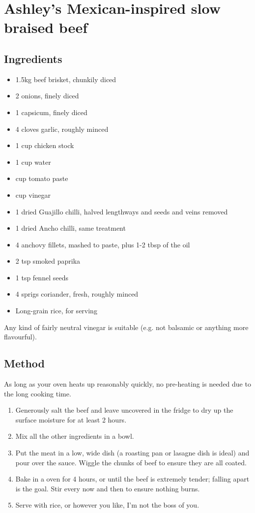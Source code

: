 \section{Ashley's Mexican-inspired slow braised beef}


\subsection{Ingredients}

\begin{itemize}
	\item 1.5kg beef brisket, chunkily diced
	\item 2 onions, finely diced
	\item 1 capsicum, finely diced
	\item 4 cloves garlic, roughly minced
	\item 1 cup chicken stock
	\item 1 cup water
	\item {} cup tomato paste
	\item {} cup vinegar
	\item 1 dried Guajillo chilli, halved lengthways and seeds and veins removed
	\item 1 dried Ancho chilli, same treatment
	\item 4 anchovy fillets, mashed to paste, plus 1-2 tbsp of the oil
	\item 2 tsp smoked paprika
	\item 1 tsp fennel seeds
	\item 4 sprigs coriander, fresh, roughly minced
	\item Long-grain rice, for serving
\end{itemize}

Any kind of fairly neutral vinegar is suitable (e.g. not balsamic or anything more flavourful).

\subsection{Method}

As long as your oven heats up reasonably quickly, no pre-heating is needed due to the long cooking time.

\begin{enumerate}
	\item Generously salt the beef and leave uncovered in the fridge to dry up the surface moisture for at least 2 hours.
	\item Mix all the other ingredients in a bowl.
	\item Put the meat in a low, wide dish (a roasting pan or lasagne dish is ideal) and pour over the sauce. Wiggle the chunks of beef to ensure they are all coated.
	\item Bake in a  oven for 4 hours, or until the beef is extremely tender; falling apart is the goal. Stir every now and then to ensure nothing burns.
	\item Serve with rice, or however you like, I'm not the boss of you.
\end{enumerate}
